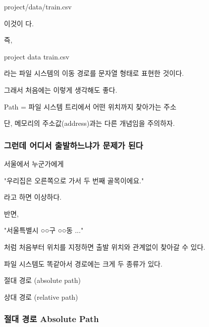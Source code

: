 \begin{dhkzsh}
project/data/train.csv
\end{dhkzsh}

이것이 다.

즉,

\begin{dhksmry}[centered]
project
\da
data
\da
train.csv
\end{dhksmry}

라는 파일 시스템의 이동 경로를 문자열 형태로 표현한 것이다.

그래서 처음에는 이렇게 생각해도 좋다.

\begin{dhknote}
\begin{dhksmry}[centered]
Path = 파일 시스템 트리에서 어떤 위치까지 찾아가는 주소
\end{dhksmry}
\end{dhknote}

단, 메모리의 주소값(address)과는 다른 개념임을 주의하자.

\subsubsection{그런데 어디서 출발하느냐가 문제가 된다}

서울에서 누군가에게

\begin{dhksmry}[centered]
"우리집은 오른쪽으로 가서 두 번째 골목이에요."
\end{dhksmry}

라고 하면 이상하다.

반면,

\begin{dhksmry}[centered]
"서울특별시 \ra ○○구 \ra ○○동 \ra ..."
\end{dhksmry}

처럼 처음부터 위치를 지정하면 출발 위치와 관계없이 찾아갈 수 있다.

파일 시스템도 똑같아서 경로에는 크게 두 종류가 있다.

\begin{dhknote}
\begin{dhksmry}[centered]
절대 경로 (absolute path)

상대 경로 (relative path)
\end{dhksmry}    
\end{dhknote}

\subsubsection{절대 경로 Absolute Path}

